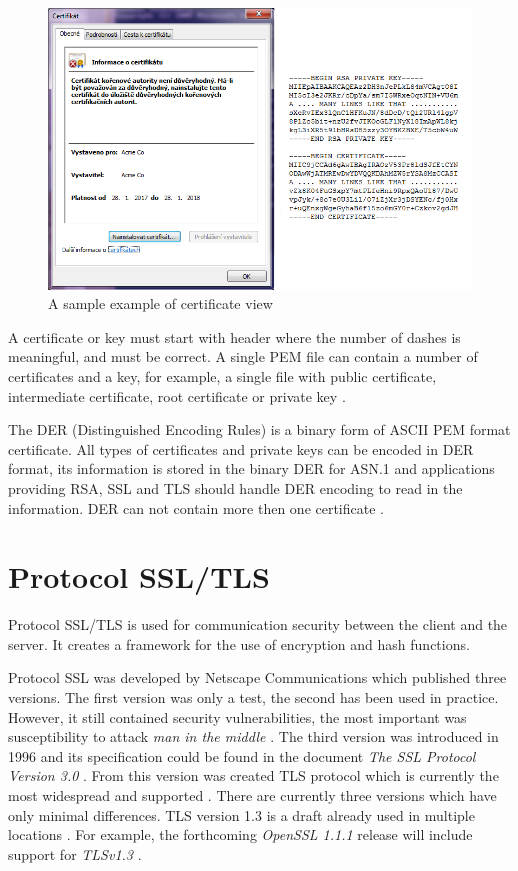 \documentclass[
  twoside, 12pt, 
  printed, %
  notable,   %
  lof,     %
  lot,     %
]{fithesis3}
\begin{document}
\begin{figure}[th]
	\centering
	\includegraphics[width=1\textwidth]{pem-der}
	\caption{A sample example of certificate view}
	\label{fig:vzorPEM-DER}
\end{figure}

A certificate or key must start with header where the number of dashes is meaningful, and must 
be correct. A single PEM file can contain a number of certificates and a key, for example, a 
single file with public certificate, intermediate certificate, root certificate or private key 
\cite{howToSsl}.

The DER (Distinguished Encoding Rules) is a binary form of ASCII PEM format 
certificate. All types of certificates and private keys can be encoded in DER format, its 
information is stored in the binary DER for ASN.1 and applications providing RSA, SSL and TLS 
should handle DER encoding to read in the information. DER can not contain more then one certificate \cite{bakker_2014}.

\section{Protocol SSL/TLS}
Protocol SSL/TLS is used for communication security between the client and the server. It 
creates a framework for the use of encryption and hash functions.

Protocol SSL was developed by Netscape Communications which published three versions. The first 
version was only a test, the second has been used in practice. However, it still contained 
security vulnerabilities, the most important was susceptibility to attack \textit{man in the 
middle} \cite{oppliger2003security}. %
The third version was introduced in 1996 and its specification could be found in the document 
\textit{The SSL Protocol Version 3.0} \cite{freier2011secure}. From this version was created TLS 
protocol which is currently the most widespread and supported \cite{oppliger2003security}. 
There are currently three versions which have only minimal differences. TLS version 1.3 is a draft 
already used in multiple locations \cite{draft-tls}. For example, the forthcoming \textit{OpenSSL 1.1.1} release will include support for \textit{TLSv1.3} \cite{foundation2}.
\end{document}
